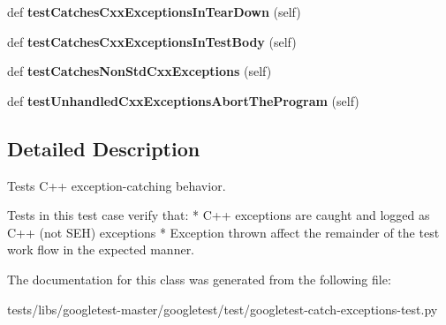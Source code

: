 \begin{DoxyCompactItemize}
\item 
\mbox{\label{classtests_1_1libs_1_1googletest-master_1_1googletest_1_1test_1_1googletest-catch-exceptions-test_1_1CatchCxxExceptionsTest_a846efa5f62637439a3e76d460115645b}} 
def {\bfseries test\+Catches\+Cxx\+Exceptions\+In\+Tear\+Down} (self)
\item 
\mbox{\label{classtests_1_1libs_1_1googletest-master_1_1googletest_1_1test_1_1googletest-catch-exceptions-test_1_1CatchCxxExceptionsTest_a5d994b471afb0bd2dc934836371540f9}} 
def {\bfseries test\+Catches\+Cxx\+Exceptions\+In\+Test\+Body} (self)
\item 
\mbox{\label{classtests_1_1libs_1_1googletest-master_1_1googletest_1_1test_1_1googletest-catch-exceptions-test_1_1CatchCxxExceptionsTest_a9c47f63af16411dfd1196edd3ebf8fbc}} 
def {\bfseries test\+Catches\+Non\+Std\+Cxx\+Exceptions} (self)
\item 
\mbox{\label{classtests_1_1libs_1_1googletest-master_1_1googletest_1_1test_1_1googletest-catch-exceptions-test_1_1CatchCxxExceptionsTest_a176c8fd6f61fd42ddd85cbe014657c01}} 
def {\bfseries test\+Unhandled\+Cxx\+Exceptions\+Abort\+The\+Program} (self)
\end{DoxyCompactItemize}


\subsection{Detailed Description}
\begin{DoxyVerb}Tests C++ exception-catching behavior.

   Tests in this test case verify that:
   * C++ exceptions are caught and logged as C++ (not SEH) exceptions
   * Exception thrown affect the remainder of the test work flow in the
     expected manner.
\end{DoxyVerb}
 

The documentation for this class was generated from the following file\+:\begin{DoxyCompactItemize}
\item 
tests/libs/googletest-\/master/googletest/test/googletest-\/catch-\/exceptions-\/test.\+py\end{DoxyCompactItemize}
